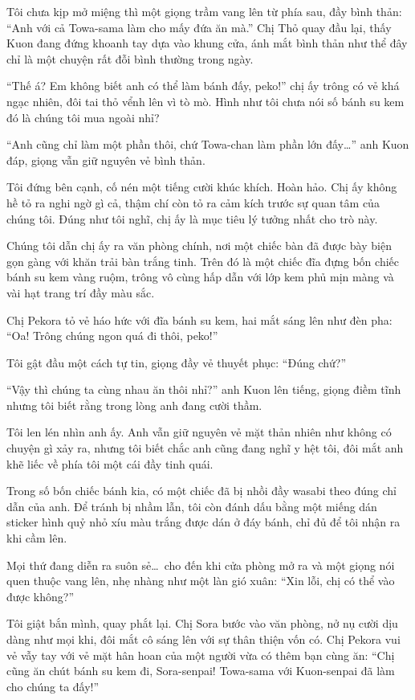 \documentclass[../main.tex]{subfiles}
\begin{document}
Tôi chưa kịp mở miệng thì một giọng trầm vang lên từ phía sau, đầy bình thản: ``Anh với cả Towa-sama làm cho mấy đứa ăn mà.'' Chị Thỏ quay đầu lại, thấy Kuon đang đứng khoanh tay dựa vào khung cửa, ánh mắt bình thản như thể đây chỉ là một chuyện rất đỗi bình thường trong ngày.

``Thế á? Em không biết anh có thể làm bánh đấy, peko!'' chị ấy trông có vẻ khá ngạc nhiên, đôi tai thỏ vểnh lên vì tò mò. Hình như tôi chưa nói số bánh su kem đó là chúng tôi mua ngoài nhỉ?

``Anh cũng chỉ làm một phần thôi, chứ Towa-chan làm phần lớn đấy\dots'' anh Kuon đáp, giọng vẫn giữ nguyên vẻ bình thản.

Tôi đứng bên cạnh, cố nén một tiếng cười khúc khích. Hoàn hảo. Chị ấy không hề tỏ ra nghi ngờ gì cả, thậm chí còn tỏ ra cảm kích trước sự quan tâm của chúng tôi. Đúng như tôi nghĩ, chị ấy là mục tiêu lý tưởng nhất cho trò này.

Chúng tôi dẫn chị ấy ra văn phòng chính, nơi một chiếc bàn đã được bày biện gọn gàng với khăn trải bàn trắng tinh. Trên đó là một chiếc đĩa đựng bốn chiếc bánh su kem vàng ruộm, trông vô cùng hấp dẫn với lớp kem phủ mịn màng và vài hạt trang trí đầy màu sắc.


Chị Pekora tỏ vẻ háo hức với đĩa bánh su kem, hai mắt sáng lên như đèn pha: ``Oa! Trông chúng ngon quá đi thôi, peko!''

Tôi gật đầu một cách tự tin, giọng đầy vẻ thuyết phục: ``Đúng chứ?''

``Vậy thì chúng ta cùng nhau ăn thôi nhỉ?'' anh Kuon lên tiếng, giọng điềm tĩnh nhưng tôi biết rằng trong lòng anh đang cười thầm.

Tôi len lén nhìn anh ấy. Anh vẫn giữ nguyên vẻ mặt thản nhiên như không có chuyện gì xảy ra, nhưng tôi biết chắc anh cũng đang nghĩ y hệt tôi, đôi mắt anh khẽ liếc về phía tôi một cái đầy tinh quái.

Trong số bốn chiếc bánh kia, có một chiếc đã bị nhồi đầy wasabi theo đúng chỉ dẫn của anh. Để tránh bị nhầm lẫn, tôi còn đánh dấu bằng một miếng dán sticker hình quỷ nhỏ xíu màu trắng được dán ở đáy bánh, chỉ đủ để tôi nhận ra khi cầm lên.

Mọi thứ đang diễn ra suôn sẻ\dots\ cho đến khi cửa phòng mở ra và một giọng nói quen thuộc vang lên, nhẹ nhàng như một làn gió xuân: ``Xin lỗi, chị có thể vào được không?''


Tôi giật bắn mình, quay phắt lại. Chị Sora bước vào văn phòng, nở nụ cười dịu dàng như mọi khi, đôi mắt cô sáng lên với sự thân thiện vốn có. Chị Pekora vui vẻ vẫy tay với vẻ mặt hân hoan của một người vừa có thêm bạn cùng ăn: ``Chị cũng ăn chút bánh su kem đi, Sora-senpai! Towa-sama với Kuon-senpai đã làm cho chúng ta đấy!''
\end{document}
